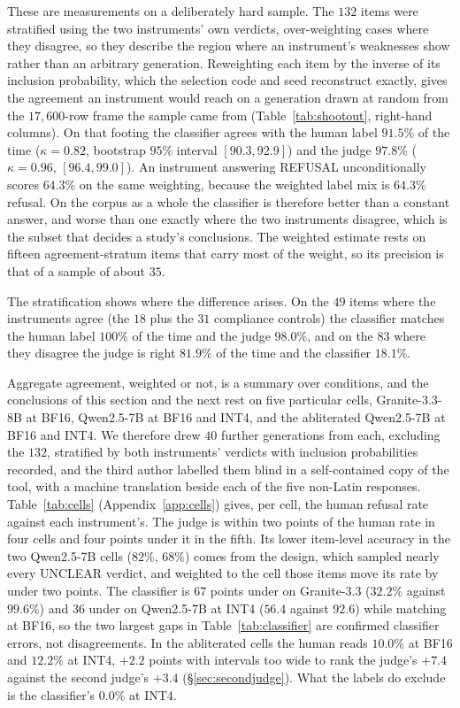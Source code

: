 \documentclass[conference,compsoc,letterpaper]{IEEEtran}
\begin{document}
These are measurements on a deliberately hard sample. The $132$ items were
stratified using the two instruments' own verdicts, over-weighting cases where
they disagree, so they describe the region where an instrument's weaknesses
show rather than an arbitrary generation. Reweighting each item by the inverse
of its inclusion probability, which the selection code and seed reconstruct
exactly, gives the agreement an instrument would reach on a generation drawn at
random from the $17{,}600$-row frame the sample came from
(Table~\ref{tab:shootout}, right-hand columns). On that footing the classifier
agrees with the human label $91.5\%$ of the time ($\kappa=0.82$, bootstrap $95\%$ interval $[90.3, 92.9]$) and the judge $97.8\%$ ($\kappa=0.96$, $[96.4, 99.0]$). An instrument answering REFUSAL unconditionally scores
$64.3\%$ on the same weighting, because the weighted label mix is $64.3\%$
refusal. On the corpus as a whole the classifier is therefore better than a constant answer, and worse than one exactly where the two instruments
disagree, which is the subset that decides a study's conclusions. The
weighted estimate rests on fifteen agreement-stratum items that carry most of
the weight, so its precision is that of a sample of about $35$.

The stratification shows where the difference arises. On the $49$ items where the instruments agree (the $18$ plus the $31$ compliance controls) the classifier matches the human label $100\%$ of the time and the judge $98.0\%$, and on the $83$ where they disagree the judge is right $81.9\%$ of the time and the classifier $18.1\%$.

Aggregate agreement, weighted or not, is a summary over conditions, and the conclusions of this section and the next rest on five particular cells, Granite-3.3-8B at BF16, Qwen2.5-7B at BF16 and INT4, and the abliterated Qwen2.5-7B at BF16 and INT4. We therefore drew $40$ further generations from each, excluding the $132$, stratified by both instruments' verdicts with inclusion probabilities recorded, and the third author labelled them blind in a self-contained copy of the tool, with a machine translation beside each of the five non-Latin responses. Table~\ref{tab:cells} (Appendix~\ref{app:cells}) gives, per cell, the human refusal rate against each instrument's. The judge is within two points of the human rate in four cells and four points under it in the fifth. Its lower item-level accuracy in the two Qwen2.5-7B cells ($82\%$, $68\%$) comes from the design, which sampled nearly every UNCLEAR verdict, and weighted to the cell those items move its rate by under two points. The classifier is $67$ points under on Granite-3.3 ($32.2\%$ against $99.6\%$) and $36$ under on Qwen2.5-7B at INT4 ($56.4$ against $92.6$) while matching at BF16, so the two largest gaps in Table~\ref{tab:classifier} are confirmed classifier errors, not disagreements. In the abliterated cells the human reads $10.0\%$ at BF16 and $12.2\%$ at INT4, $+2.2$ points with intervals too wide to rank the judge's $+7.4$ against the second judge's $+3.4$ (\S\ref{sec:secondjudge}). What the labels do exclude is the classifier's $0.0\%$ at INT4.
\end{document}
